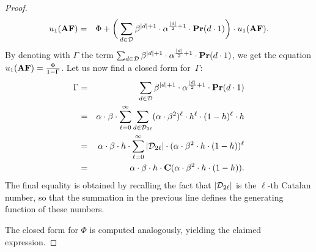 \begin{proof}
%
\begin{eqnarray*}
 u_1(\text{\rm {\bf AF}}) & = & \Phi + 
 \bigg(\sum_{d\in \mathcal{D}} \beta^{|d|+1}\cdot \alpha^{\frac{|d|}{2}+1}\cdot \mathbf{Pr}(d\cdot 1)\bigg) \cdot u_1(\text{\rm {\bf AF}}).
\end{eqnarray*}
%
By denoting with $\Gamma$ the term $\sum_{d\in \mathcal{D}} \beta^{|d|+1}\cdot \alpha^{\frac{|d|}{2}+1}\cdot \mathbf{Pr}(d\cdot 1)$, we get the equation
$u_1(\text{\rm {\bf AF}}) = \frac{\Phi}{1-\Gamma}$.
Let us now find a closed form for~$\Gamma$:
%
\begin{eqnarray*}
\Gamma & = & \sum_{d\in \mathcal{D}} \beta^{|d|+1}\cdot \alpha^{\frac{|d|}{2}+1}\cdot \mathbf{Pr}(d\cdot 1)\\
& = & \alpha\cdot \beta \cdot \sum_{\ell = 0}^{\infty} \sum_{d\in \mathcal{D}_{2\ell}} (\alpha\cdot \beta^2)^{\ell}\cdot h^{\ell}\cdot (1-h)^{\ell}\cdot h\\
& = & \alpha\cdot \beta \cdot h \cdot \sum_{\ell = 0}^{\infty} |\mathcal{D}_{2\ell}| \cdot (\alpha\cdot \beta^2 \cdot h \cdot (1-h))^{\ell}\\
& = & \alpha\cdot \beta \cdot h \cdot \mathbf{C}(\alpha\cdot\beta^2 \cdot h \cdot (1-h)).
\end{eqnarray*}
%
The final equality is obtained by recalling the fact that $|\mathcal{D}_{2\ell}|$ is the $\ell$-th Catalan number, so that the summation in the previous line defines the generating function of these numbers. 

The closed form for $\Phi$ is computed analogously, yielding the claimed expression.
\end{proof}



